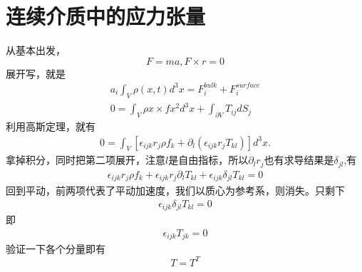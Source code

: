 \documentclass{article}
\newcommand{\p}{\partial}
\newcommand{\e}{\epsilon}
\begin{document}
\section{连续介质中的应力张量}
从基本出发，
\begin{equation}
F=ma,F\times r=0
\end{equation}
展开写，就是
\begin{align}
       a_i\int_V \rho(x,t)d^3x=F^{bulk}_i+F^{surface}_i\\
    0=\int_V \rho x\times fx^2 d^3x+\int_{\partial V}T_{ij}dS_j 
\end{align}
利用高斯定理，就有
\begin{align}
 0=\int_V[\epsilon_{ijk}r_j\rho f_k+\partial _l(\epsilon_{ijk}r_jT_{kl})]d^3 x.
\end{align}
拿掉积分，同时把第二项展开，注意$l$是自由指标，所以$\partial_l r_j$也有求导结果是$\delta_{jl}$,有
\begin{align}
    \e_{ijk}r_j\rho f_k+\e_{ijk}r_j\p_l T_{kl}+\e_{ijk}\delta_{jl}T_{kl}=0
\end{align}
回到平动，前两项代表了平动加速度，我们以质心为参考系，则消失。只剩下
\begin{align}
    \e_{ijk}\delta_{jl}T_{kl}=0
\end{align}
即
\begin{align}
    \e_{ijk}T_{jk}=0
\end{align}
验证一下各个分量即有$$T=T^T$$
\end{document}
